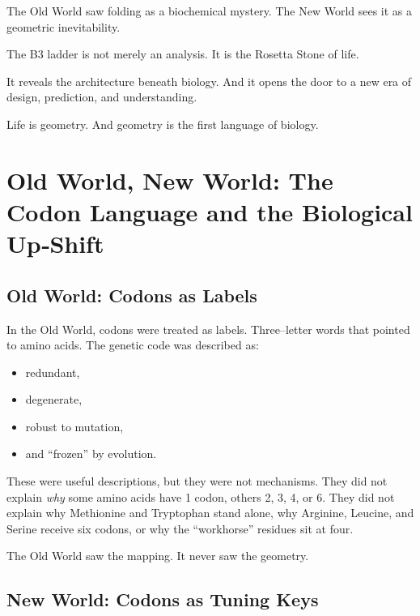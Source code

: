 \documentclass[11pt, letterpaper, openany]{book}
\begin{document}
The Old World saw folding as a biochemical mystery.  
The New World sees it as a geometric inevitability.

The B3 ladder is not merely an analysis.  
It is the Rosetta Stone of life.

It reveals the architecture beneath biology.  
And it opens the door to a new era of design, prediction, and understanding.

Life is geometry.  
And geometry is the first language of biology.


\chapter{Old World, New World: The Codon Language and the Biological Up‑Shift}

\section*{Old World: Codons as Labels}

In the Old World, codons were treated as labels. Three–letter words that pointed
to amino acids. The genetic code was described as:

\begin{itemize}
    \item redundant,
    \item degenerate,
    \item robust to mutation,
    \item and “frozen” by evolution.
\end{itemize}

These were useful descriptions, but they were not mechanisms. They did not
explain \textit{why} some amino acids have 1 codon, others 2, 3, 4, or 6. They
did not explain why Methionine and Tryptophan stand alone, why Arginine,
Leucine, and Serine receive six codons, or why the “workhorse” residues sit at
four.

The Old World saw the mapping.  
It never saw the geometry.

\section*{New World: Codons as Tuning Keys}
\end{document}
